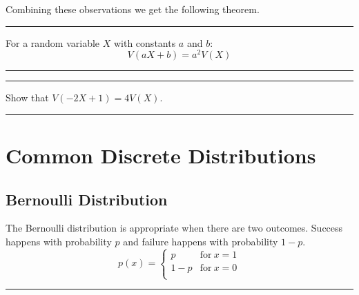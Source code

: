 \documentclass[
]{book}
\theoremstyle{definition}
\theoremstyle{definition}
\theoremstyle{definition}
\theoremstyle{remark}
\let\BeginKnitrBlock\begin \let\EndKnitrBlock\end
\begin{document}
Combining these observations we get the following theorem.

\begin{center}\rule{0.5\linewidth}{0.5pt}\end{center}

\BeginKnitrBlock{theorem}[V(aX+b)]
\protect\hypertarget{thm:unnamed-chunk-18}{}{\label{thm:unnamed-chunk-18} {} }For a random variable \(X\) with constants \(a\) and \(b\):
\[V(aX+b) = a^2 V(X)\]
\EndKnitrBlock{theorem}

\begin{center}\rule{0.5\linewidth}{0.5pt}\end{center}

\begin{center}\rule{0.5\linewidth}{0.5pt}\end{center}

\BeginKnitrBlock{exercise}
\protect\hypertarget{exr:unnamed-chunk-19}{}{\label{exr:unnamed-chunk-19} }Show that \(V(-2X+1) = 4V(X)\).
\EndKnitrBlock{exercise}

\begin{center}\rule{0.5\linewidth}{0.5pt}\end{center}

\hypertarget{common-discrete-distributions}{%
\chapter{Common Discrete Distributions}\label{common-discrete-distributions}}

\hypertarget{bernoulli-distribution}{%
\section{Bernoulli Distribution}\label{bernoulli-distribution}}

The Bernoulli distribution is appropriate when there are two outcomes. Success happens with probability \(p\) and failure happens with probability \(1-p\).
\begin{equation*} 
    p(x) =
    \left\{
        \begin{array}{cc}
                p & \mathrm{for\ } x=1 \\
                1-p & \mathrm{for\ } x=0 \\
        \end{array} 
    \right.
\label{eq:bernoulli}
\end{equation*}

\begin{center}\rule{0.5\linewidth}{0.5pt}\end{center}
\end{document}
